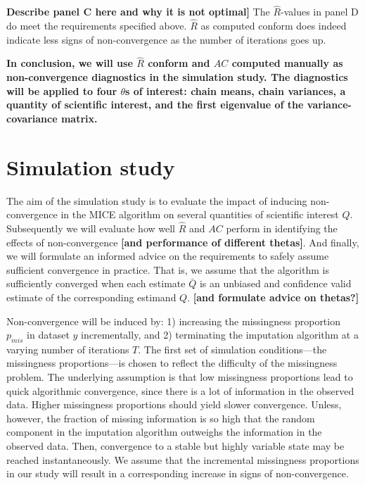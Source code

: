 \documentclass[Royal,times,sageh]{sagej}
\begin{document}
\textbf{Describe panel C here and why it is not optimal{]}} The \(\widehat{R}\)-values in panel D do meet the requirements specified above. \(\widehat{R}\) as computed conform \citet{veht19} does indeed indicate less signs of non-convergence as the number of iterations goes up. \textbf{\citep[explain the dip in Rhat values at t=2. Namely, because we can only use 2 of the 3 tricks by][ if the number of iterations is very low (t\textless4). That's why the \(\widehat{R}\)s are more similar to the traditional GR.]{veht19}}

\textbf{In conclusion, we will use \(\widehat{R}\) conform \citet{veht19} and \(AC\) computed manually as non-convergence diagnostics in the simulation study. The diagnostics will be applied to four \(\theta\)s of interest: chain means, chain variances, a quantity of scientific interest, and the first eigenvalue of the variance-covariance matrix.}

\hypertarget{simulation-study}{%
\section{Simulation study}\label{simulation-study}}

The aim of the simulation study is to evaluate the impact of inducing non-convergence in the MICE algorithm on several quantities of scientific interest \(Q\). Subsequently we will evaluate how well \(\widehat{R}\) and \(AC\) perform in identifying the effects of non-convergence \textbf{{[}and performance of different thetas{]}}. And finally, we will formulate an informed advice on the requirements to safely assume sufficient convergence in practice. That is, we assume that the algorithm is sufficiently converged when each estimate \(\bar{Q}\) is an unbiased and confidence valid estimate of the corresponding estimand \(Q\). \textbf{{[}and formulate advice on thetas?{]}}

Non-convergence will be induced by: 1) increasing the missingness proportion \(p_{mis}\) in dataset \(y\) incrementally, and 2) terminating the imputation algorithm at a varying number of iterations \(T\). The first set of simulation conditions---the missingness proportions---is chosen to reflect the difficulty of the missingness problem. The underlying assumption is that low missingness proportions lead to quick algorithmic convergence, since there is a lot of information in the observed data. Higher missingness proportions should yield slower convergence. Unless, however, the fraction of missing information is so high that the random component in the imputation algorithm outweighs the information in the observed data. Then, convergence to a stable but highly variable state may be reached instantaneously. We assume that the incremental missingness proportions in our study will result in a corresponding increase in signs of non-convergence.
\end{document}
